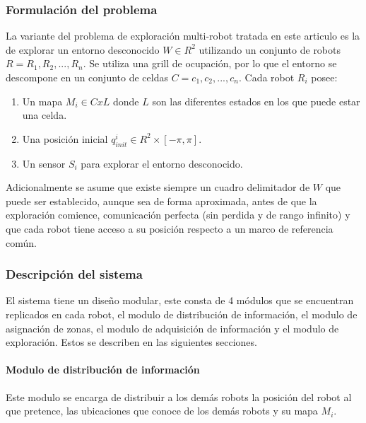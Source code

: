\subsubsection{Formulación del problema}
La variante del problema de exploración multi-robot tratada en este articulo es la de explorar un entorno desconocido $W\in R^2$ utilizando un conjunto de robots $R={R_1,R_2,...,R_n}$. Se utiliza una grill  de ocupación, por lo que el entorno se descompone en un conjunto de celdas $C={c_1,c_2,...,c_n}$. Cada robot $R_i$ posee: 
\begin{enumerate}
  \item Un mapa $M_i \in CxL$ donde $L$ son las diferentes estados en los que puede estar una celda. 
  \item Una posición inicial $q_{init}^{i}\in R^2 \times [-\pi,\pi]$. 
  \item Un sensor $S_i$ para explorar el entorno desconocido.
\end{enumerate}

Adicionalmente se asume que existe siempre un cuadro delimitador de $W$ que puede ser establecido, aunque sea de forma aproximada, antes de que la exploración comience, comunicación perfecta (sin perdida y de rango infinito) y que cada robot tiene acceso a su posición respecto a un marco de referencia común.

\subsubsection{Descripción del sistema}
El sistema tiene un diseño modular, este consta de 4 módulos que se encuentran replicados en cada robot, el modulo de distribución de información, el modulo de asignación de zonas, el modulo de adquisición de información y el modulo de exploración. Estos se describen en las siguientes secciones. 

\paragraph{Modulo de distribución de información}
Este modulo se encarga de distribuir a los demás robots la posición del robot al que pretence, las ubicaciones que conoce de los demás robots y su mapa $M_i$. 


